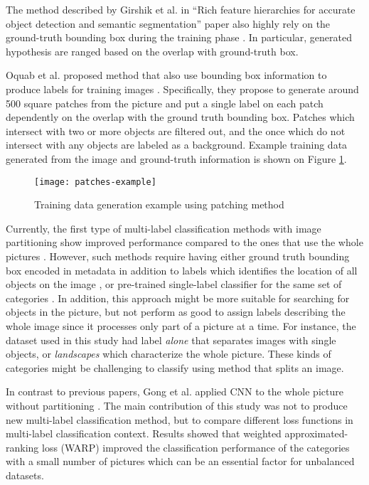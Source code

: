 The method described by Girshik et al. in ``Rich feature hierarchies for accurate object detection and semantic segmentation'' paper also highly rely on the ground-truth bounding box during the training phase \cite{Girshick2014}. In particular, generated hypothesis are ranged based on the overlap with ground-truth box.

Oquab et al. proposed method that also use bounding box information to produce labels for training images \cite{Oquab2014TransferringMidLevel}. Specifically, they propose to generate around 500 square patches from the picture and put a single label on each patch dependently on the overlap with the ground truth bounding box. Patches which intersect with two or more objects are filtered out, and the once which do not intersect with any objects are labeled as a background. Example training data generated from the image and ground-truth information is shown on Figure \ref{fig:patches-example}.

\begin{figure}[H]
    \centering
    \texttt{[image: patches-example]}
    \caption{Training data generation example using patching method \cite{Oquab2014TransferringMidLevel}}
    \label{fig:patches-example}
\end{figure}

Currently, the first type of multi-label classification methods with image partitioning show improved performance compared to the ones that use the whole pictures \cite{Wei2016HCP, Ren2016, Yang2015}. However, such methods require having either ground truth bounding box encoded in metadata in addition to labels which identifies the location of all objects on the image \cite{Chen2015ContextualizingClassification, Dong2013Subcategory-AwareClassification}, or pre-trained single-label classifier for the same set of categories \cite{Wei2016HCP}. In addition, this approach might be more suitable for searching for objects in the picture, but not perform as good to assign labels describing the whole image since it processes only part of a picture at a time. For instance, the dataset used in this study had label \textit{alone} that separates images with single objects, or \textit{landscapes} which characterize the whole picture. These kinds of categories might be challenging to classify using method that splits an image.

In contrast to previous papers, Gong et al. applied CNN to the whole picture without partitioning \cite{Gong2013DeepRanking}. The main contribution of this study was not to produce new multi-label classification method, but to compare different loss functions in multi-label classification context. Results showed that weighted approximated-ranking loss (WARP) improved the classification performance of the categories with a small number of pictures which can be an essential factor for unbalanced datasets.


